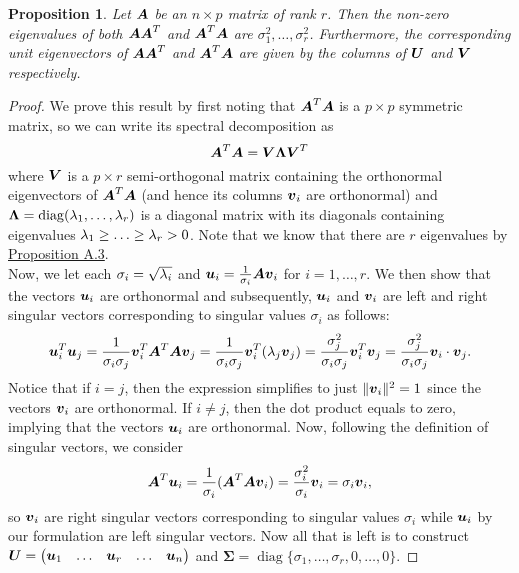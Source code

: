 \documentclass[12pt]{article}
\newtheorem{prop}{Proposition}[section]
\DeclareMathOperator{\diag}{diag}
\newcommand{\Sg}{\Sigma}
\begin{document}
	\begin{prop}\label{prop1}
		Let $\boldsymbol{A}$ be an $n\times p$ matrix of rank $r$. Then the non-zero eigenvalues of both $\boldsymbol{A}\boldsymbol{A}^T$ and $\boldsymbol{A}^T\boldsymbol{A}$ are $\sigma_1^2,\ldots,\sigma_r^2$.
		Furthermore, the corresponding unit eigenvectors of $\boldsymbol{A}\boldsymbol{A}^T$ and $\boldsymbol{A}^T\boldsymbol{A}$ are given by the columns of $\boldsymbol{U}$ and $\boldsymbol{V}$ respectively.
	\end{prop}
	
	\begin{proof}
		We prove this result by first noting that $\boldsymbol{A}^T\boldsymbol{A}$ is a $p\times p$ symmetric matrix, so we can write its spectral decomposition as
		$$\boldsymbol{A}^T\boldsymbol{A}=\boldsymbol{V}\boldsymbol{\Lambda}\boldsymbol{V}^T$$
		where $\boldsymbol{V}$ is a $p\times r$ {semi-orthogonal} matrix containing the orthonormal eigenvectors of $\boldsymbol{A}^T\boldsymbol{A}$ (and hence its columns $\boldsymbol{v}_i$ are orthonormal) and $\boldsymbol{\Lambda}=\diag(\lm_1,\ldots,\lm_r)$ is a diagonal matrix with its diagonals containing eigenvalues $\lambda_1\geq\ldots\geq\lambda_r>0$. Note that we know that there are $r$ eigenvalues by \hyperref[prop1]{Proposition A.3}. \\
		
		Now, we let each $\sigma_i=\sqrt{\lambda_i}$ and $\boldsymbol{u}_i=\frac{1}{\sigma_i}\boldsymbol{A}\boldsymbol{v}_i$ for $i=1,\ldots,r$. We then show that the vectors $\boldsymbol{u}_i$ are orthonormal and subsequently, $\boldsymbol{u}_i$ and $\boldsymbol{v}_i$ are left and right singular vectors corresponding to singular values $\sigma_i$ as follows:
		\begin{align*}
			\boldsymbol{u}_i^T\boldsymbol{u}_j
			=\frac{1}{\sigma_i\sigma_j}\boldsymbol{v}_i^T{\boldsymbol{A}^T\boldsymbol{A}\boldsymbol{v}_j}
			=\frac{1}{\sigma_i\sigma_j}\boldsymbol{v}_i^T({\lambda_j\boldsymbol{v}_j})
			=\frac{\sigma_j^2}{\sigma_i\sigma_j}\boldsymbol{v}_i^T\boldsymbol{v}_j
			=\frac{\sigma_j^2}{\sigma_i\sigma_j}\boldsymbol{v}_i\cdot\boldsymbol{v}_j.
		\end{align*}
		Notice that if $i=j$, then the expression simplifies to just $\|\boldsymbol{v}_i\|^2=1$ since the vectors $\boldsymbol{v}_i$ are orthonormal. If $i\neq j$, then the dot product equals to zero, implying that the vectors $\boldsymbol{u}_i$ are orthonormal. Now, following the definition of singular vectors, we consider
		$$\boldsymbol{A}^T{\boldsymbol{u}_i}={\frac{1}{\sigma_i}}(\boldsymbol{A}^T{\boldsymbol{A}\boldsymbol{v}_i})=\frac{{\sigma_i^2}}{\sigma_i}{\boldsymbol{v}_i}=\sigma_i\boldsymbol{v}_i,$$
		so $\boldsymbol{v}_i$ are right singular vectors corresponding to singular values $\sigma_i$ while $\boldsymbol{u}_i$ by our formulation are left singular vectors. Now all that is left is to construct $\boldsymbol{U}=\begin{pmatrix}
			\boldsymbol{u}_1 & \ldots & \boldsymbol{u}_r & \ldots & \boldsymbol{u}_n
		\end{pmatrix}$ and $\boldsymbol{\Sg}=\diag\{\sigma_1,\ldots,\sigma_r,0,\ldots,0\}$. 
	\end{proof}
	
\end{document}
